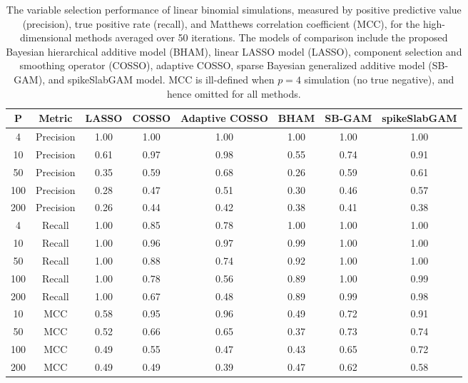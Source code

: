 \begin{table}[ht]
\centering
\begin{tabular}{cccccccc}
  \hline
P & Metric & LASSO & COSSO & Adaptive COSSO & BHAM & SB-GAM & spikeSlabGAM \\ 
  \hline
  4 & Precision & 1.00 & 1.00 & 1.00 & 1.00 & 1.00 & 1.00 \\ 
   10 & Precision & 0.61 & 0.97 & 0.98 & 0.55 & 0.74 & 0.91 \\ 
   50 & Precision & 0.35 & 0.59 & 0.68 & 0.26 & 0.59 & 0.61 \\ 
  100 & Precision & 0.28 & 0.47 & 0.51 & 0.30 & 0.46 & 0.57 \\ 
  200 & Precision & 0.26 & 0.44 & 0.42 & 0.38 & 0.41 & 0.38 \\ 
   \hline
  4 & Recall & 1.00 & 0.85 & 0.78 & 1.00 & 1.00 & 1.00 \\ 
   10 & Recall & 1.00 & 0.96 & 0.97 & 0.99 & 1.00 & 1.00 \\ 
   50 & Recall & 1.00 & 0.88 & 0.74 & 0.92 & 1.00 & 1.00 \\ 
  100 & Recall & 1.00 & 0.78 & 0.56 & 0.89 & 1.00 & 0.99 \\ 
  200 & Recall & 1.00 & 0.67 & 0.48 & 0.89 & 0.99 & 0.98 \\ 
   \hline
 10 & MCC & 0.58 & 0.95 & 0.96 & 0.49 & 0.72 & 0.91 \\ 
   50 & MCC & 0.52 & 0.66 & 0.65 & 0.37 & 0.73 & 0.74 \\ 
  100 & MCC & 0.49 & 0.55 & 0.47 & 0.43 & 0.65 & 0.72 \\ 
  200 & MCC & 0.49 & 0.49 & 0.39 & 0.47 & 0.62 & 0.58 \\ 
   \hline
\end{tabular}
\caption{The variable selection performance of linear binomial simulations,
                         measured by positive predictive value (precision), true positive rate (recall),
                         and Matthews correlation coefficient (MCC), for the high-dimensional methods
                         averaged over 50 iterations. The models of comparison include the proposed Bayesian
                         hierarchical additive model (BHAM), linear LASSO model (LASSO), component selection
                         and smoothing operator (COSSO), adaptive COSSO, sparse Bayesian generalized
                         additive model (SB-GAM), and spikeSlabGAM model. MCC is ill-defined when $p=4$
                         simulation (no true negative), and hence omitted for all methods.} 
\label{tab:sim_lnr_binom_var_select}
\end{table}
